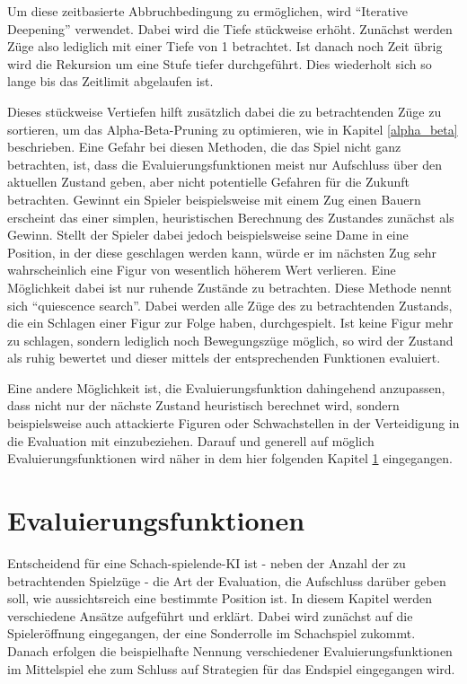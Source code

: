 Um diese zeitbasierte Abbruchbedingung zu ermöglichen, wird ``Iterative Deepening'' verwendet. Dabei wird die Tiefe stückweise erhöht. Zunächst werden Züge also lediglich mit einer Tiefe von 1 betrachtet. Ist danach noch Zeit übrig wird die Rekursion um eine Stufe tiefer durchgeführt. Dies wiederholt sich so lange bis das Zeitlimit abgelaufen ist. \cite{Russell2010}


Dieses stückweise Vertiefen hilft zusätzlich dabei die zu betrachtenden Züge zu sortieren, um das Alpha-Beta-Pruning zu optimieren, wie in Kapitel \ref{alpha_beta} beschrieben.
Eine Gefahr bei diesen Methoden, die das Spiel nicht ganz betrachten, ist, dass die Evaluierungsfunktionen meist nur Aufschluss über den aktuellen Zustand geben, aber nicht potentielle Gefahren für die Zukunft betrachten. Gewinnt ein Spieler beispielsweise mit einem Zug einen Bauern erscheint das einer simplen, heuristischen Berechnung des Zustandes zunächst als Gewinn. Stellt der Spieler dabei jedoch beispielsweise seine Dame in eine Position, in der diese geschlagen werden kann, würde er im nächsten Zug sehr wahrscheinlich eine Figur von wesentlich höherem Wert verlieren.
Eine Möglichkeit dabei ist nur ruhende Zustände zu betrachten. Diese Methode nennt sich ``quiescence search''. Dabei werden alle Züge des zu betrachtenden Zustands, die ein Schlagen einer Figur zur Folge haben, durchgespielt. Ist keine Figur mehr zu schlagen, sondern lediglich noch Bewegungszüge möglich, so wird der Zustand als ruhig bewertet und dieser mittels der entsprechenden Funktionen evaluiert. \cite{Russell2010} \label{quiescence}


Eine andere Möglichkeit ist, die Evaluierungsfunktion dahingehend anzupassen, dass nicht nur der nächste Zustand heuristisch berechnet wird, sondern beispielsweise auch attackierte Figuren oder Schwachstellen in der Verteidigung in die Evaluation mit einzubeziehen. Darauf und generell auf möglich Evaluierungsfunktionen wird näher in dem hier folgenden Kapitel \ref{evaluation} eingegangen.

\section{Evaluierungsfunktionen}\label{evaluation}

Entscheidend für eine Schach-spielende-KI ist - neben der Anzahl der zu betrachtenden Spielzüge - die Art der Evaluation, die Aufschluss darüber geben soll, wie aussichtsreich eine bestimmte Position ist. In diesem Kapitel werden verschiedene Ansätze aufgeführt und erklärt. Dabei wird zunächst auf die Spieleröffnung eingegangen, der eine Sonderrolle im Schachspiel zukommt. Danach erfolgen die beispielhafte Nennung verschiedener Evaluierungsfunktionen im Mittelspiel ehe zum Schluss auf Strategien für das Endspiel eingegangen wird.

